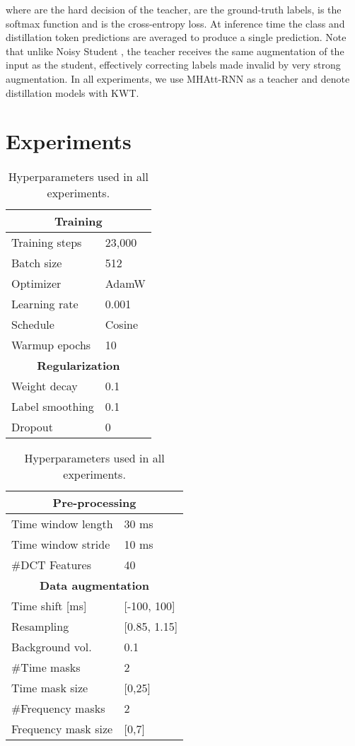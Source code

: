 \documentclass[a4paper]{article}
\begin{document}
where  are the hard decision of the teacher,  are the ground-truth labels,  is the softmax function and  is the cross-entropy loss. At inference time the class and distillation token predictions are averaged to produce a single prediction. Note that unlike Noisy Student \cite{xie2020student}, the teacher receives the same augmentation of the input as the student, effectively correcting labels made invalid by very strong augmentation. In all experiments, we use MHAtt-RNN as a teacher and denote distillation models with KWT\alembic.

\section{Experiments}

\begin{table}[t]
\scriptsize
\caption{Hyperparameters used in all experiments.}
\label{tab:hyperparams}
\centering
\begin{tabular}{ll}
\toprule
\multicolumn{2}{c}{\textbf{Training}} \\
\midrule
Training steps & 23,000 \\
Batch size & 512 \\
Optimizer & AdamW \\
Learning rate & 0.001 \\
Schedule & Cosine \\
Warmup epochs & 10 \\
\midrule
\multicolumn{2}{c}{\textbf{Regularization}} \\
\midrule
Weight decay & 0.1 \\
Label smoothing & 0.1 \\
Dropout & 0 \\ 
\bottomrule
\end{tabular}
\qquad
\begin{tabular}{ll}
\toprule
\multicolumn{2}{c}{\textbf{Pre-processing}} \\
\midrule
Time window length & 30 ms \\
Time window stride & 10 ms \\
\#DCT Features & 40 \\
\midrule
\multicolumn{2}{c}{\textbf{Data augmentation}} \\
\midrule
Time shift [ms] & [-100, 100] \\
Resampling & [0.85, 1.15] \\
Background vol. & 0.1 \\
\#Time masks & 2 \\
Time mask size & [0,25] \\
\#Frequency masks & 2 \\
Frequency mask size & [0,7] \\
\bottomrule
\end{tabular}
\end{table}
\end{document}
